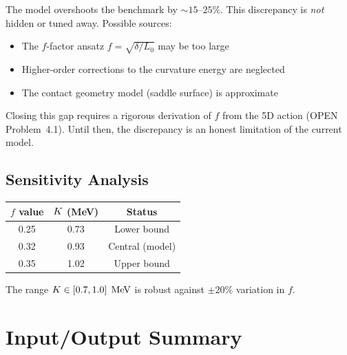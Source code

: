 The model overshoots the benchmark by $\sim 15$--$25\%$. This discrepancy is
\emph{not} hidden or tuned away. Possible sources:
\begin{itemize}
    \item The $f$-factor ansatz $f = \sqrt{\delta/L_0}$ may be too large
    \item Higher-order corrections to the curvature energy are neglected
    \item The contact geometry model (saddle surface) is approximate
\end{itemize}

Closing this gap requires a rigorous derivation of $f$ from the 5D action
(OPEN Problem~4.1). Until then, the discrepancy is an honest limitation of
the current model.

\subsection{Sensitivity Analysis}

\begin{center}
\begin{tabular}{ccc}
    \toprule
    $f$ value & $K$ (MeV) & Status \\
    \midrule
    0.25 & 0.73 & Lower bound \\
    0.32 & 0.93 & Central (model) \\
    0.35 & 1.02 & Upper bound \\
    \bottomrule
\end{tabular}
\end{center}

The range $K \in [0.7, 1.0]\;\,\mathrm{MeV}$ is robust against $\pm 20\%$ variation in $f$.

\section{Input/Output Summary}
\label{sec:sigmaK:table}

